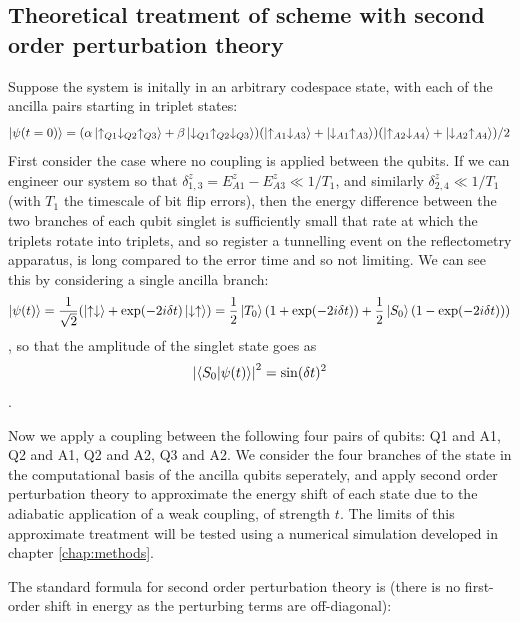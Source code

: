 \documentclass{report}
\begin{document}
\subsection{Theoretical treatment of scheme with second order perturbation theory}

Suppose the system is initally in an arbitrary codespace state, with each of the ancilla pairs starting in triplet states:
\begin{equation*}
    \ket{\psi(t = 0)} = (\alpha\ket{\uparrow_{Q1}\downarrow_{Q2}\uparrow_{Q3}} + \beta\ket{\downarrow_{Q1}\uparrow_{Q2}\downarrow_{Q3}})(\ket{\uparrow_{A1}\downarrow_{A3}} + \ket{\downarrow_{A1}\uparrow_{A3}})(\ket{\uparrow_{A2}\downarrow_{A4}} + \ket{\downarrow_{A2}\uparrow_{A4}}) / 2
\end{equation*}
First consider the case where no coupling is applied between the qubits. If we can engineer our system so that $\delta_{1,3}^z = E_{A1}^z - E_{A3}^z \ll 1/T_1$, and similarly $\delta_{2,4}^z \ll 1/T_1$ (with $T_1$ the timescale of bit flip errors), then the energy difference between the two branches of each qubit singlet is sufficiently small that rate at which the triplets rotate into triplets, and so register a tunnelling event on the reflectometry apparatus, is long compared to the error time and so not limiting. We can see this by considering a single ancilla branch:
\begin{equation}
    \ket{\psi(t)} = \frac{1}{\sqrt{2}}(\ket{\uparrow\downarrow} + \exp(-2i\delta t)\ket{\downarrow\uparrow}) = \frac{1}{2}\ket{T_0}(1 + \exp(-2i\delta t)) + \frac{1}{2}\ket{S_0}(1 - \exp(-2i\delta t)))
\end{equation} \label{eq:triplet_to_singlet}, so that the amplitude of the singlet state goes as 
\begin{equation*}
    \left|\braket{S_0|\psi(t)}\right|^2 = \sin(\delta t)^2
\end{equation*}.

Now we apply a coupling between the following four pairs of qubits: Q1 and A1, Q2 and A1, Q2 and A2, Q3 and A2. We consider the four branches of the state in the computational basis of the ancilla qubits seperately, and apply second order perturbation theory to approximate the energy shift of each state due to the adiabatic application of a weak coupling, of strength $t$. The limits of this approximate treatment will be tested using a numerical simulation developed in chapter \ref{chap:methods}.

The standard formula for second order perturbation theory is (there is no first-order shift in energy as the perturbing terms are off-diagonal):
\end{document}
